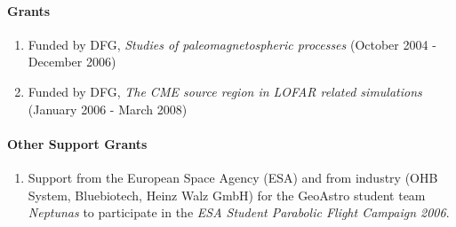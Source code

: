 \paragraph{Grants}

\begin{enumerate}
\item
Funded by DFG, \emph{Studies of paleomagnetospheric processes}
(October 2004 - December 2006)
\item
Funded by DFG, \emph{The CME source region in LOFAR related
simulations} (January 2006 - March 2008)
\end{enumerate}

\paragraph{Other Support Grants}
\begin{enumerate}
\item Support from the European Space Agency (ESA) and from
industry (OHB System, Bluebiotech, Heinz Walz GmbH) for the GeoAstro
student team \emph{Neptunas\/} to participate in the \emph{ESA
Student Parabolic Flight Campaign 2006\/}.
\end{enumerate}
\nocite{vogt:terra-nostra-vogt-etal-2006}
\nocite{vogt:asr-zieger-etal-2006}
\nocite{vogt:jgr-zieger-etal-2006}
